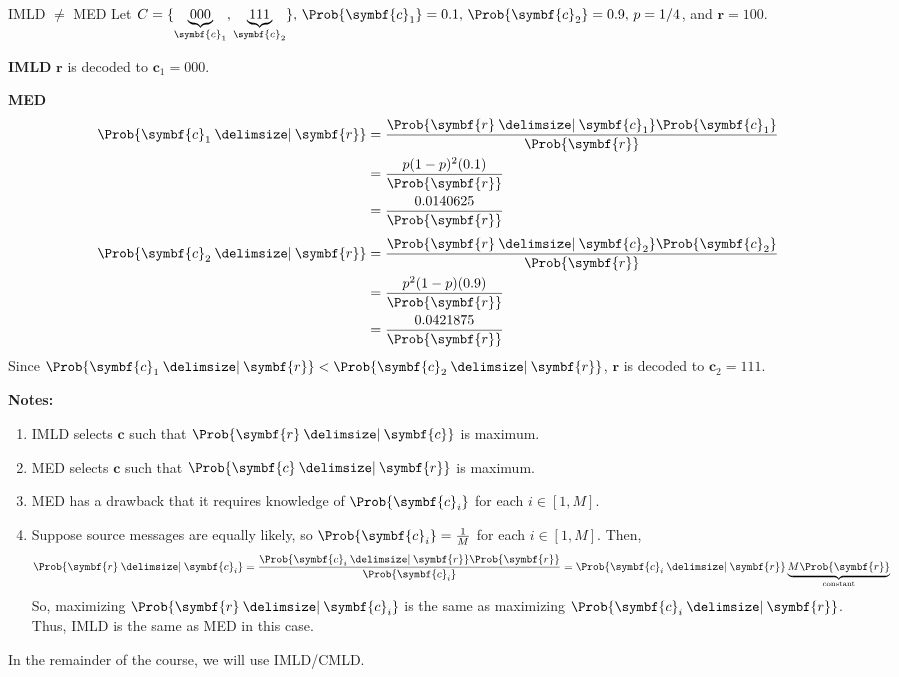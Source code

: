 \begin{Example}{IMLD $ \neq $ MED}{}
    Let $ C=\set{\underbrace{000}_{\symbf{c}_1},\underbrace{111}_{\symbf{c}_2}},\,
        \Prob{\symbf{c}_1}=0.1,\, \Prob{\symbf{c}_2}=0.9,\, p=1/4 $, and $ \symbf{r}=100 $.

    \textbf{IMLD} $ \symbf{r} $ is decoded to $ \symbf{c}_1 = 000 $.

    \textbf{MED}
    \begin{align*}
        \Prob{\symbf{c}_1\given \symbf{r}}
         & =\frac{\Prob{\symbf{r}\given \symbf{c}_1}\Prob{\symbf{c}_1}}{\Prob{\symbf{r}}} \\
         & =\frac{p(1-p)^2(0.1)}{\Prob{\symbf{r}}}                                        \\
         & =\frac{0.0140625}{\Prob{\symbf{r}}}
    \end{align*}
    \begin{align*}
        \Prob{\symbf{c}_2\given \symbf{r}}
         & =\frac{\Prob{\symbf{r}\given \symbf{c}_2}\Prob{\symbf{c}_2}}{\Prob{\symbf{r}}} \\
         & =\frac{p^2(1-p)(0.9)}{\Prob{\symbf{r}}}                                        \\
         & =\frac{0.0421875}{\Prob{\symbf{r}}}
    \end{align*}
    Since $ \Prob{\symbf{c}_1\given \symbf{r}}<\Prob{\symbf{c}_2\given \symbf{r}} $,
    $ \symbf{r} $ is decoded to $ \symbf{c}_2=111 $.
\end{Example}


\textbf{Notes:}
\begin{enumerate}[label=(\roman*)]
    \item IMLD selects $ \symbf{c} $ such that $ \Prob{\symbf{r}\given \symbf{c}} $ is maximum.
    \item MED selects $ \symbf{c} $ such that $ \Prob{\symbf{c}\given \symbf{r}} $ is maximum.
    \item MED has a drawback that it requires knowledge of $ \Prob{\symbf{c}_i} $ for
          each $ i\in [1,M] $.
    \item Suppose source messages are equally likely, so
          $ \Prob{\symbf{c}_i}=\frac{1}{M} $ for each $ i\in[1,M] $.
          Then,
          \[ \Prob{\symbf{r}\given \symbf{c}_i}=\frac{\Prob{\symbf{c}_i\given \symbf{r}}\Prob{\symbf{r}}}{\Prob{\symbf{c}_i}}
              =\Prob{\symbf{c}_i\given \symbf{r}} \underbrace{M \Prob{\symbf{r}}}_{\text{constant}}\]
          So, maximizing $ \Prob{\symbf{r}\given \symbf{c}_i} $ is the same as maximizing
          $ \Prob{\symbf{c}_i\given \symbf{r}} $. Thus, IMLD is the same as MED in this case.
\end{enumerate}
In the remainder of the course, we will use IMLD/CMLD\@.
